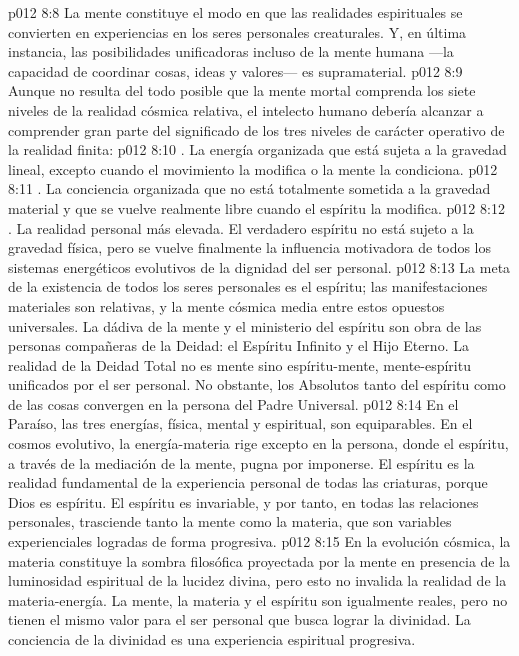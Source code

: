 \vs p012 8:8 La mente constituye el modo en que las realidades espirituales se convierten en experiencias en los seres personales creaturales. Y, en última instancia, las posibilidades unificadoras incluso de la mente humana ---la capacidad de coordinar cosas, ideas y valores--- es supramaterial.
\vs p012 8:9 \pc Aunque no resulta del todo posible que la mente mortal comprenda los siete niveles de la realidad cósmica relativa, el intelecto humano debería alcanzar a comprender gran parte del significado de los tres niveles de carácter operativo de la realidad finita:
\vs p012 8:10 . La energía organizada que está sujeta a la gravedad lineal, excepto cuando el movimiento la modifica o la mente la condiciona.
\vs p012 8:11 . La conciencia organizada que no está totalmente sometida a la gravedad material y que se vuelve realmente libre cuando el espíritu la modifica.
\vs p012 8:12 . La realidad personal más elevada. El verdadero espíritu no está sujeto a la gravedad física, pero se vuelve finalmente la influencia motivadora de todos los sistemas energéticos evolutivos de la dignidad del ser personal.
\vs p012 8:13 \pc La meta de la existencia de todos los seres personales es el espíritu; las manifestaciones materiales son relativas, y la mente cósmica media entre estos opuestos universales. La dádiva de la mente y el ministerio del espíritu son obra de las personas compañeras de la Deidad: el Espíritu Infinito y el Hijo Eterno. La realidad de la Deidad Total no es mente sino espíritu\hyp{}mente, mente\hyp{}espíritu unificados por el ser personal. No obstante, los Absolutos tanto del espíritu como de las cosas convergen en la persona del Padre Universal.
\vs p012 8:14 \pc En el Paraíso, las tres energías, física, mental y espiritual, son equiparables. En el cosmos evolutivo, la energía\hyp{}materia rige excepto en la persona, donde el espíritu, a través de la mediación de la mente, pugna por imponerse. El espíritu es la realidad fundamental de la experiencia personal de todas las criaturas, porque Dios es espíritu. El espíritu es invariable, y por tanto, en todas las relaciones personales, trasciende tanto la mente como la materia, que son variables experienciales logradas de forma progresiva.
\vs p012 8:15 En la evolución cósmica, la materia constituye la sombra filosófica proyectada por la mente en presencia de la luminosidad espiritual de la lucidez divina, pero esto no invalida la realidad de la materia\hyp{}energía. La mente, la materia y el espíritu son igualmente reales, pero no tienen el mismo valor para el ser personal que busca lograr la divinidad. La conciencia de la divinidad es una experiencia espiritual progresiva.
